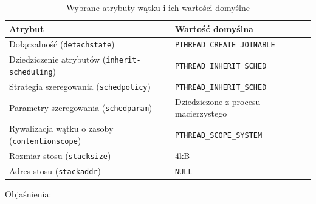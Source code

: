 \begin{table}[h!]
\centering
\caption{Wybrane atrybuty wątku i ich wartości domyślne}
\setlength{\arrayrulewidth}{1pt}
\setlength{\tabcolsep}{6pt}
\renewcommand{\arraystretch}{1.2}
\begin{tabular}{ |p{}|p{}| }
\hline \rowcolor{gray}
\textbf{Atrybut} & \textbf{Wartość domyślna} \\ \hline 
Dołączalność (\mbox{\lstinline[style=MyCStyle]{detachstate}}) & \mbox{\lstinline[style=MyCStyle]{PTHREAD_CREATE_JOINABLE}} \\ \hline
Dziedziczenie atrybutów (\mbox{\lstinline[style=MyCStyle]{inherit-scheduling}}) & \mbox{\lstinline[style=MyCStyle]{PTHREAD_INHERIT_SCHED}} \\ \hline 
Strategia szeregowania (\mbox{\lstinline[style=MyCStyle]{schedpolicy}}) & \mbox{\lstinline[style=MyCStyle]{PTHREAD_INHERIT_SCHED}} \\ \hline 
Parametry szeregowania (\mbox{\lstinline[style=MyCStyle]{schedparam}}) & Dziedziczone z procesu macierzystego \\ \hline 
Rywalizacja wątku o zasoby (\mbox{\lstinline[style=MyCStyle]{contentionscope}}) & \mbox{\lstinline[style=MyCStyle]{PTHREAD_SCOPE_SYSTEM}} \\ \hline 
Rozmiar stosu (\mbox{\lstinline[style=MyCStyle]{stacksize}}) & 4kB \\ \hline 
Adres stosu (\mbox{\lstinline[style=MyCStyle]{stackaddr}}) & \mbox{\lstinline[style=MyCStyle]{NULL}} \\ \hline 
\end{tabular}
\label{tab:atrybuty1}
\end{table}


Objaśnienia:

